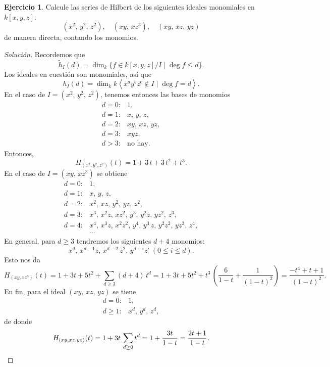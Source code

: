 \documentclass{article}
\theoremstyle{definition}
\newtheorem{ejerc}{Ejercicio}
\newenvironment{solucion}{\begin{proof}[Solución]}{\end{proof}}
\begin{document}
\begin{ejerc}
  \label{ejerc:series-de-Hilbert-ideales-monomiales}
  Calcule las series de Hilbert de los siguientes ideales monomiales en
  $k [x,y,z]$:
  $$(x^2, \, y^2, \, z^2), \quad (xy, \, xz^3), \quad (xy, \, xz, \, yz)$$
  de manera directa, contando los monomios.

  \ifdefined\solutions\begin{solucion}
    Recordemos que
    $$\widetilde{h}_I (d) = \dim_k \{ f\in k[x,y,z]/I \mid \deg f \le d \}.$$
    Los ideales en cuestión son monomiales, así que
    $$h_I (d) = \dim_k k \left< x^ay^bz^c\notin I \mid \deg f = d \right>.$$
    En el caso de $I = (x^2, \, y^2, \, z^2)$, tenemos entonces las bases de
    monomios
    \begin{align*}
      d=0\colon & 1,\\
      d=1\colon & x, \, y, \, z,\\
      d=2\colon & xy, \, xz, \, yz,\\
      d=3\colon & xyz,\\
      d > 3\colon & \text{no hay}.
    \end{align*}
    Entonces,
    $$H_{(x^2, y^2, z^2)} (t) = 1 + 3\,t + 3\,t^2 + t^3.$$
    En el caso de $I = (xy, \, xz^3)$ se obtiene
    \begin{align*}
      d=0\colon & 1,\\
      d=1\colon & x, \, y, \, z,\\
      d=2\colon & x^2, \, xz, \, y^2, \, yz, \, z^2,\\
      d=3\colon & x^3, \, x^2z, \, xz^2, \, y^3, \, y^2z, \, yz^2, \, z^3,\\
      d=4\colon & x^4, \, x^3z, \, x^2z^2, \, y^4, \, y^3\,z, \, y^2z^2, \, yz^3, \, z^4,\\
                & \cdots
    \end{align*}
    En general, para $d \ge 3$ tendremos los siguientes $d+4$ monomios:
    $$x^d, \, x^{d-1}z, \, x^{d-2}\,z^2, \, y^{d-i}z^i ~ (0 \le i \le d).$$
    Esto nos da
    \[ H_{(xy, xz^3)} (t) =
       1 + 3t + 5t^2 + \sum_{d\ge 3} (d+4)\,t^d =
       1 + 3t + 5t^2 + t^3\,\left(\frac{6}{1-t} + \frac{1}{(1-t)^2}\right) =
       \frac{-t^4+t+1}{(1-t)^2}. \]
    En fin, para el ideal $(xy, \, xz, \, yz)$ se tiene
    \begin{align*}
      d=0\colon & 1,\\
      d\ge 1\colon & x^d, \, y^d, \, z^d,
    \end{align*}
    de donde
    \[ H_{(xy, xz, yz)} (t) =
       1 + 3t\,\sum_{d\ge 0} t^d =
       1 + \frac{3t}{1-t} =
       \frac{2t+1}{1-t}. \qedhere \]
  \end{solucion}\fi
\end{ejerc}
\end{document}

